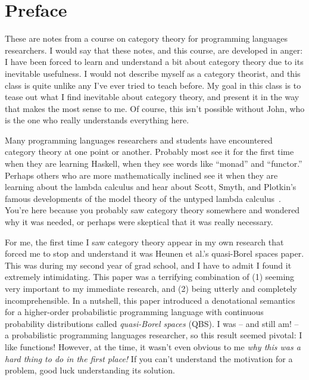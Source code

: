 \chapter*{Preface}

These are notes from a course on category theory for programming languages researchers.  I
would say that these notes, and this course, are developed in anger: I have been
forced to learn and understand a bit about category theory due to its inevitable
usefulness. 
I would not describe myself as a category theorist, and this class is quite 
unlike any I've ever tried to teach before.
My goal in this class is to tease out what I find inevitable 
about category theory, and present it in the way that makes the most sense to 
me. Of course, this isn't possible without John, who is the one who 
really understands everything here.

Many programming languages researchers and students have encountered category
theory at one point or another. Probably most see it for the first time when
they are learning Haskell, when they see words like ``monad'' and ``functor.''
Perhaps others who are more mathematically inclined see it when they are
learning about the lambda calculus and hear about Scott, Smyth, and Plotkin's
famous developments of the model theory of the untyped lambda
calculus~\citep{smyth1982category}. You're here because you probably saw 
category theory somewhere and wondered why it was needed, or perhaps 
were skeptical that it was really necessary.

For me, the first time I saw category theory appear in my own research that 
forced me to stop and understand it was Heunen et al.'s quasi-Borel spaces paper.\cite{heunen2017convenient} This was
during my second year of grad school, and I have to admit I found it 
extremely intimidating. This paper was a terrifying combination of (1) seeming 
very important to my immediate research, and (2) being utterly and completely incomprehensible.
In a nutshell, this paper introduced a denotational semantics for a higher-order 
probabilistic programming language with continuous probability distributions called \emph{quasi-Borel spaces} (QBS).
I was -- and still am! -- a probabilistic programming languages researcher, so this result seemed pivotal: 
I like functions!
However, at the time, it wasn't even obvious to me \emph{why this was a hard thing to do
in the first place!} If you can't understand the motivation for a problem, 
good luck understanding its solution. 

